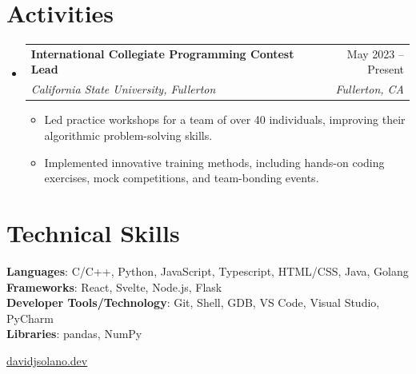 \documentclass[letterpaper,11pt]{article}
\makeatletter
\newcommand{\resumeItem}[1]{
  \item\small{
    {#1 \vspace{-2pt}}
  }
}
\newcommand{\resumeSubheading}[4]{
  \vspace{-2pt}\item
    \begin{tabular*}{0.97\textwidth}[t]{l@{\extracolsep{\fill}}r}
      \textbf{#1} & #2 \\
      \textit{\small#3} & \textit{\small #4} \\
    \end{tabular*}\vspace{-7pt}
}
\newcommand{\resumeSubHeadingListStart}{\begin{itemize}[leftmargin=0.15in, label={}]}
\newcommand{\resumeSubHeadingListEnd}{\end{itemize}}
\newcommand{\resumeItemListStart}{\begin{itemize}}
\newcommand{\resumeItemListEnd}{\end{itemize}\vspace{-5pt}}
\makeatother
\begin{document}
%
\section{Activities}
  \resumeSubHeadingListStart

    \resumeSubheading
      {International Collegiate Programming Contest Lead}{May 2023 -- Present}
      {California State University, Fullerton}{Fullerton, CA}
      \resumeItemListStart
        \resumeItem{Led practice workshops for a team of over 40 individuals, improving their algorithmic problem-solving skills.}
        \resumeItem{Implemented innovative training methods, including hands-on coding exercises, mock competitions, and team-bonding events.}
      \resumeItemListEnd

  \resumeSubHeadingListEnd
\section{Technical Skills}
 \begin{itemize}[leftmargin=0.15in, label={}]
    \small{\item{
     \textbf{Languages}{: C/C++, Python, JavaScript, Typescript, HTML/CSS, Java, Golang} \\
     \textbf{Frameworks}{: React, Svelte, Node.js, Flask} \\
     \textbf{Developer Tools/Technology}{: Git, Shell, GDB, VS Code, Visual Studio, PyCharm} \\
     \textbf{Libraries}{: pandas, NumPy}
    }}
 \end{itemize}

\begin{center}
  \small \vspace{10pt} \href{https://www.davidsolano.dev}{davidjsolano.dev}
\end{center}
\end{document}

